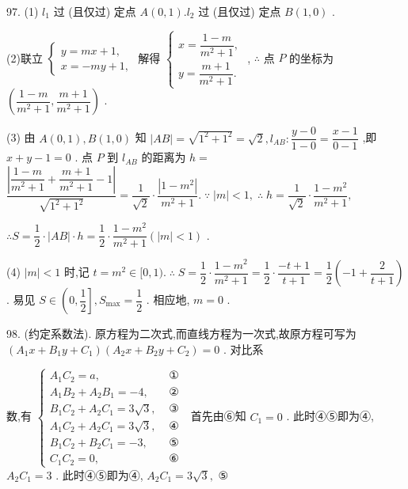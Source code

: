 97. (1) ${l}_{1}$ 过 (且仅过) 定点 $A\left( {0,1}\right) .{l}_{2}$ 过 (且仅过) 定点 $B\left( {1,0}\right)$ .

(2)联立 $\left\{  \begin{array}{l} y = {mx} + 1, \\  x =  - {my} + 1, \end{array}\right.$ 解得 $\left\{  \begin{array}{l} x = \dfrac{1 - m}{{m}^{2} + 1}, \\  y = \dfrac{m + 1}{{m}^{2} + 1}. \end{array}\right.$ , $\therefore$ 点 $P$ 的坐标为 $\left( {\dfrac{1 - m}{{m}^{2} + 1},\dfrac{m + 1}{{m}^{2} + 1}}\right)$ .

(3) 由 $A\left( {0,1}\right) ,B\left( {1,0}\right)$ 知 $\left| {AB}\right|  = \sqrt{{1}^{2} + {1}^{2}} = \sqrt{2},{l}_{AB} : \dfrac{y - 0}{1 - 0} = \dfrac{x - 1}{0 - 1}$ ,即 $x + y - 1 = 0$ . 点 $P$ 到 ${l}_{AB}$ 的距离为 $h =$  $\dfrac{\left| \dfrac{1 - m}{{m}^{2} + 1} + \dfrac{m + 1}{{m}^{2} + 1} - 1\right| }{\sqrt{{1}^{2} + {1}^{2}}} = \dfrac{1}{\sqrt{2}} \cdot  \dfrac{\left| 1 - {m}^{2}\right| }{{m}^{2} + 1}.\;\because \;\left| m\right|  < 1,\;\therefore \;h = \dfrac{1}{\sqrt{2}} \cdot  \dfrac{1 - {m}^{2}}{{m}^{2} + 1},$

$\therefore S = \dfrac{1}{2} \cdot  \left| {AB}\right|  \cdot  h = \dfrac{1}{2} \cdot  \dfrac{1 - {m}^{2}}{{m}^{2} + 1}\left( {\left| m\right|  < 1}\right)$ .

(4) $\left| m\right|  < 1$ 时,记 $t = {m}^{2} \in  \lbrack 0,1).\;\therefore \;S = \dfrac{1}{2} \cdot  \dfrac{1 - {m}^{2}}{{m}^{2} + 1} = \dfrac{1}{2} \cdot  \dfrac{-t + 1}{t + 1} = \dfrac{1}{2}\left( {-1 + \dfrac{2}{t + 1}}\right)$ . 易见 $S \in  \left( {0,\dfrac{1}{2}}\right\rbrack  ,{S}_{\max } = \dfrac{1}{2}$ . 相应地, $m = 0$ .

98. (约定系数法). 原方程为二次式,而直线方程为一次式,故原方程可写为 $\left( {{A}_{1}x + {B}_{1}y + {C}_{1}}\right) \left( {{A}_{2}x + {B}_{2}y + {C}_{2}}\right)  = 0$ . 对比系

数,有 $\left\{  \begin{array}{ll} {A}_{1}{C}_{2} = a, & \text{ ① } \\  {A}_{1}{B}_{2} + {A}_{2}{B}_{1} =  - 4, & \text{ ② } \\  {B}_{1}{C}_{2} + {A}_{2}{C}_{1} = 3\sqrt{3}, & \text{ ③ } \\  {A}_{1}{C}_{2} + {A}_{2}{C}_{1} = 3\sqrt{3}, & \text{ ④ } \\  {B}_{1}{C}_{2} + {B}_{2}{C}_{1} =  - 3, & \text{ ⑤ } \\  {C}_{1}{C}_{2} = 0, & \text{ ⑥ } \end{array}\right.$ 首先由⑥知 ${C}_{1} = 0$ . 此时④⑤即为④, ${A}_{2}{C}_{1} = 3$ . 此时④⑤即为④, ${A}_{2}{C}_{1} = 3\sqrt{3},$ ⑤

